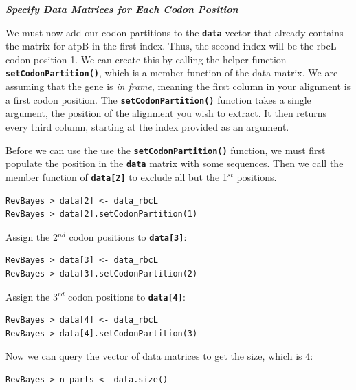 \documentclass[11pt]{article}
\newcommand{\cl}[1]{{\texttt{\textbf{#1}}}}
\begin{document}
\textbf{\textit{Specify Data Matrices for Each Codon Position}}

We must now add our codon-partitions to the \cl{data} vector that already contains the matrix for atpB in the first index. 
Thus, the second index will be the rbcL codon position 1. 
We can create this by calling the helper function \cl{setCodonPartition()}, which is a member function of the data matrix. 
We are assuming that the gene is \textit{in frame}, meaning the first column in your alignment is a first codon position. 
The \cl{setCodonPartition()} function takes a single argument, the position of the alignment you wish to extract. 
It then returns every third column, starting at the index provided as an argument.

Before we can use the use the \cl{setCodonPartition()} function, we must first populate the position in the \cl{data} matrix with some sequences. 
Then we call the member function of \cl{data[2]} to exclude all but the 1$^{st}$ positions.
{\tt \begin{snugshade*}
\begin{lstlisting}
RevBayes > data[2] <- data_rbcL
RevBayes > data[2].setCodonPartition(1)
\end{lstlisting}
\end{snugshade*}}

Assign the 2$^{nd}$ codon positions to \cl{data[3]}:
{\tt \begin{snugshade*}
\begin{lstlisting}
RevBayes > data[3] <- data_rbcL
RevBayes > data[3].setCodonPartition(2)
\end{lstlisting}
\end{snugshade*}}

Assign the 3$^{rd}$ codon positions to \cl{data[4]}:
{\tt \begin{snugshade*}
\begin{lstlisting}
RevBayes > data[4] <- data_rbcL
RevBayes > data[4].setCodonPartition(3)
\end{lstlisting}
\end{snugshade*}}



Now we can query the vector of data matrices to get the size, which is 4:
{\tt \begin{snugshade*}
\begin{lstlisting}
RevBayes > n_parts <- data.size()
\end{lstlisting}
\end{snugshade*}}
\end{document}
